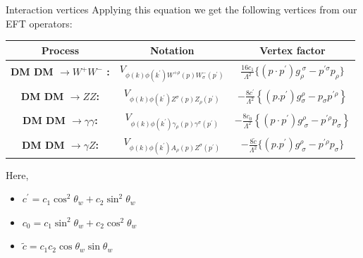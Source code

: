 \documentclass[11pt]{beamer}
\begin{document}
\begin{frame}{Interaction vertices}
Applying this equation we get the following vertices from our EFT operators:
\vspace{0.5cm}

\begin{tiny}

\begin{tabular}{|c|c|c|}
\hline
Process & Notation & Vertex factor \\ \hline
\textbf{DM DM $\longrightarrow W^+W^-$ :}  & $ V_{\phi(k) \phi(k^\prime) W^{+\rho}(p) W^-_\sigma(p^\prime)} $ & $\frac{16c_1}{\Lambda^2} \{(p\cdot p^\prime) g_\rho^{\;\sigma}-p^{\prime \sigma} p_\rho\} \label{wv}$\\ \hline
\textbf{DM DM $\longrightarrow ZZ$:} & $
V_{\phi(k) \phi(k^\prime) Z^\sigma(p) Z_\rho(p^\prime)}  $ & $-\frac{8c^\prime}{\Lambda^2} \left\{ (p.p^\prime) g^\rho_{\sigma} - p_\sigma p^{\prime \rho} \right\} \label{zv}$  \\ \hline

\textbf{DM DM $\longrightarrow \gamma \gamma$:} & $ V_{\phi(k) \phi(k^\prime) \gamma_\rho(p) \gamma^\sigma(p^\prime)}$ & $ -\frac{8c_0}{\Lambda^2} \left\{ (p\cdot p^\prime) g^\rho_{\; \sigma }- p^{\prime \rho} p_\sigma \right\} \label{gv} $ \\ \hline

\textbf{DM DM $\longrightarrow \gamma Z$:} & $ V_{\phi(k) \phi(k^\prime) A_\rho(p) Z^\sigma(p^\prime)} $ & $ -\frac{8\tilde{c}}{\Lambda^2} \{ (p.p^\prime) g^\rho_{\; \sigma} - p^{\prime \rho} p_\sigma \} \label{gzv} $ \\ \hline
\end{tabular}

\end{tiny}

Here,
\begin{itemize}
\item $c^\prime = c_1\cos^2\theta_w+c_2\sin^2\theta_w$
\item $c_0 = c_1\sin^2\theta_w +c_2 \cos^2\theta_w$
\item $\tilde{c}= c_1 c_2 \cos\theta_w \sin\theta_w $
\end{itemize}


\end{frame}
\end{document}
